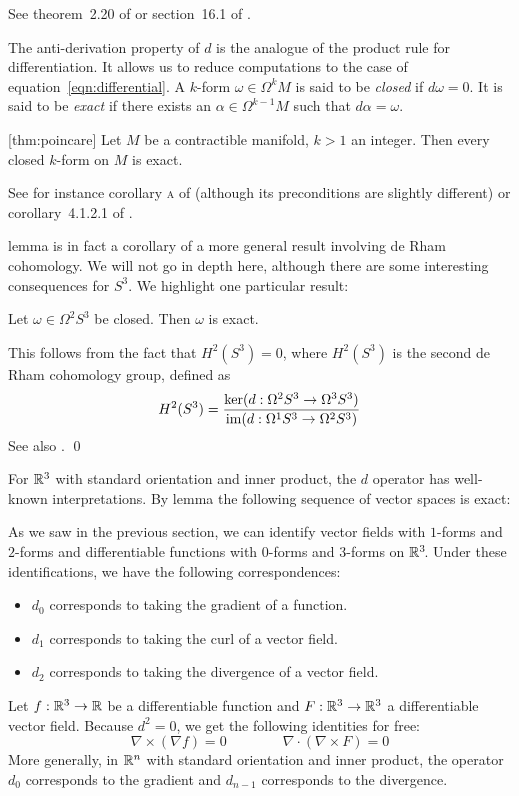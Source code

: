 \proof
See theorem~2.20 of \parencite[p.~65]{warner1971} or section~16.1 of \parencite[p.~448]{szekeres2004}.

The anti-derivation property of $d$ is the analogue of the product rule for differentiation.
It allows us to reduce computations to the case of equation~\ref{eqn:differential}.
A $k$-form $\omega \in \Omega^k M$ is said to be \emph{closed} if $d\omega = 0$.
It is said to be \emph{exact} if there exists an $\alpha \in \Omega^{k - 1} M$ such that $d\alpha = \omega$.

[thm:poincare]
Let $M$ be a contractible manifold, $k > 1$ an integer.
Then every closed $k$-form on $M$ is exact.

\proof
See for instance corollary \textsc{a} of \parencite[p.~156]{warner1971}
(although its preconditions are slightly different)
or corollary~4.1.2.1 of \parencite[p.~36]{bott1982}.

\poincares lemma is in fact a corollary of a more general result involving de Rham cohomology.
We will not go in depth here,
although there are some interesting consequences for $S^3\!$.
We highlight one particular result:

Let $\omega \in \Omega^2 S^3$ be closed.
Then $\omega$ is exact.

\proof
This follows from the fact that $H^2(S^3) = 0$,
where $H^2(S^3)$ is the second de Rham cohomology group,
defined as
\[ H^2(S^3) = \frac{\ker(d: \Omega^2 S^3 \to \Omega^3 S^3)}{\operatorname{im}(d: \Omega^1 S^3 \to \Omega^2 S^3)} \]
See also \parencite[p.~36]{bott1982}.
\qed

For $\mathbb{R}^3$ with standard orientation and inner product,
the $d$ operator has well-known interpretations.
By \poincares lemma the following sequence of vector spaces is exact:
\begin{center}
\end{center}
As we saw in the previous section,
we can identify vector fields with $1$-forms and $2$-forms
and differentiable functions with $0$-forms and $3$-forms on $\mathbb{R}^3\!$.
Under these identifications,
we have the following correspondences:
\begin{itemize}
\item $d_0$ corresponds to taking the gradient of a function.
\item $d_1$ corresponds to taking the curl of a vector field.
\item $d_2$ corresponds to taking the divergence of a vector field.
\end{itemize}
Let $f : \mathbb{R}^3 \to \mathbb{R}$ be a differentiable function
and $F : \mathbb{R}^3 \to \mathbb{R}^3$ a differentiable vector field.
Because $d^2 = 0$,
we get the following identities for free:
\[ \nabla \times {(\nabla f)} = 0
   \qquad\qquad
   \nabla \cdot {(\nabla \times F)} = 0 \]
More generally,
in $\mathbb{R}^n$ with standard orientation and inner product,
the operator $d_0$ corresponds to the gradient and $d_{n-1}$ corresponds to the divergence.

